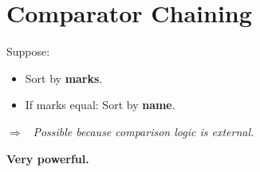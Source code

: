 \documentclass[11pt,a4paper]{book}
\begin{document}


\section{Comparator Chaining}

Suppose:

\begin{itemize}
    \item Sort by \textbf{\textcolor{RosettaBlue}{marks}}.

    \item If marks equal: 
    Sort by \textbf{\textcolor{RosettaBlue}{name}}.
\end{itemize}

\noindent
\textcolor{RosettaRoyalPurple}{$\Rightarrow$}
\ \emph{Possible because comparison logic is external.}

\smallskip

\noindent
\textbf{\textcolor{RosettaJade}{Very powerful.}}
















\end{document}

